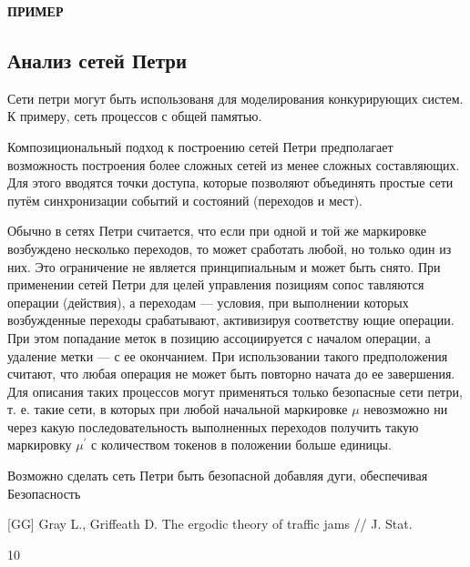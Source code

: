 \documentclass[a4paper,14pt]{article}
\begin{document}
\textbf{ПРИМЕР}

\subsection{Анализ сетей Петри}
Сети петри могут быть использованя для моделирования конкурирующих систем. К примеру, сеть процессов с общей памятью. 

\par Композициональный подход к построению сетей Петри предполагает возможность построения более сложных сетей из менее сложных составляющих. Для этого вводятся точки доступа, которые позволяют объединять простые сети путём синхронизации событий и состояний (переходов и мест).
\par Обычно в сетях Петри считается, что если при одной и той же маркировке возбуждено несколько переходов, то может сработать любой, но только один из них. Это ограничение не является принципиальным и может быть снято.
При применении сетей Петри для целей управления позициям сопос­
тавляются операции (действия), а переходам — условия, при выполнении
которых возбужденные переходы срабатывают, активизируя соответству­ ющие операции. При этом попадание меток в позицию ассоциируется с началом операции, а удаление метки — с ее окончанием. При использовании такого предположения считают, что любая операция не может быть повторно начата до ее завершения. Для описания таких процессов могут применяться только безопасные сети петри, т. е. такие сети, в которых при любой начальной маркировке $\mu$ невозможно ни через какую последовательность выполненных переходов получить такую маркировку $\mu^{'}$ с количеством токенов в положении больше единицы.
\par Возможно сделать сеть Петри быть безопасной добавляя дуги, обеспечивая 
Безопасность 







\begin{thebibliography}{10}
[GG] Gray L., Griffeath D. The ergodic theory of traffic jams // J. Stat. 
\end{thebibliography}{10}
\end{document}
